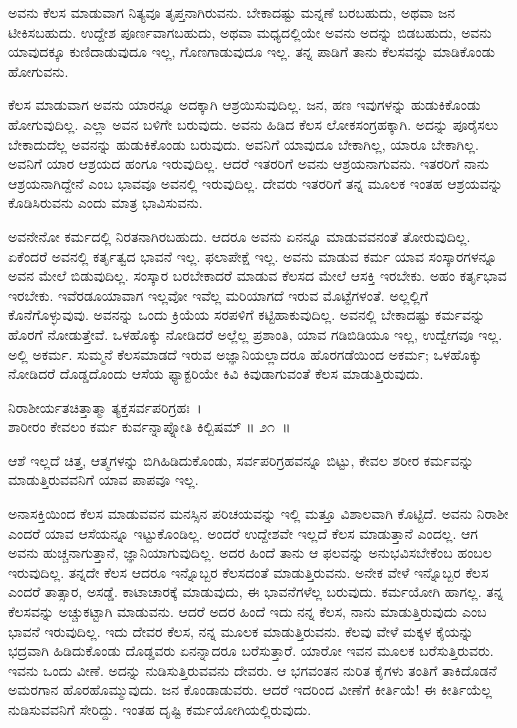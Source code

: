 ಅವನು ಕೆಲಸ ಮಾಡುವಾಗ ನಿತ್ಯವೂ ತೃಪ್ತನಾಗಿರುವನು. ಬೇಕಾದಷ್ಟು ಮನ್ನಣೆ ಬರಬಹುದು, ಅಥವಾ ಜನ ಟೀಕಿಸಬಹುದು. ಉದ್ದೇಶ ಪೂರ್ಣವಾಗಬಹುದು, ಅಥವಾ ಮಧ್ಯ\-ದಲ್ಲಿಯೇ ಅವನು ಅದನ್ನು ಬಿಡಬಹುದು, ಅವನು ಯಾವುದಕ್ಕೂ ಕುಣಿದಾಡುವುದೂ ಇಲ್ಲ, ಗೊಣಗಾಡುವುದೂ ಇಲ್ಲ. ತನ್ನ ಪಾಡಿಗೆ ತಾನು ಕೆಲಸವನ್ನು ಮಾಡಿಕೊಂಡು ಹೋಗುವನು.

ಕೆಲಸ ಮಾಡುವಾಗ ಅವನು ಯಾರನ್ನೂ ಅದಕ್ಕಾಗಿ ಆಶ್ರಯಿಸುವುದಿಲ್ಲ. ಜನ, ಹಣ ಇವುಗಳನ್ನು ಹುಡುಕಿಕೊಂಡು ಹೋಗುವುದಿಲ್ಲ. ಎಲ್ಲಾ ಅವನ ಬಳಿಗೇ ಬರುವುದು. ಅವನು ಹಿಡಿದ ಕೆಲಸ ಲೋಕಸಂಗ್ರಹಕ್ಕಾಗಿ. ಅದನ್ನು ಪೂರೈಸಲು ಬೇಕಾದುದೆಲ್ಲ ಅವನನ್ನು ಹುಡುಕಿಕೊಂಡು ಬರುವುದು. ಅವನಿಗೆ ಯಾವುದೂ ಬೇಕಾಗಿಲ್ಲ, ಯಾರೂ ಬೇಕಾಗಿಲ್ಲ. ಅವನಿಗೆ ಯಾರ ಆಶ್ರಯದ ಹಂಗೂ ಇರುವುದಿಲ್ಲ. ಆದರೆ ಇತರರಿಗೆ ಅವನು ಆಶ್ರಯನಾಗುವನು. ಇತರರಿಗೆ ನಾನು ಆಶ್ರಯನಾಗಿದ್ದೇನೆ ಎಂಬ ಭಾವವೂ ಅವನಲ್ಲಿ ಇರುವುದಿಲ್ಲ. ದೇವರು ಇತರರಿಗೆ ತನ್ನ ಮೂಲಕ ಇಂತಹ ಆಶ್ರಯವನ್ನು ಕೊಡಿಸಿರುವನು ಎಂದು ಮಾತ್ರ ಭಾವಿಸುವನು.

ಅವನೇನೋ ಕರ್ಮದಲ್ಲಿ ನಿರತನಾಗಿರಬಹುದು. ಆದರೂ ಅವನು ಏನನ್ನೂ ಮಾಡುವವ\-ನಂತೆ ತೋರುವುದಿಲ್ಲ. ಏಕೆಂದರೆ ಅವನಲ್ಲಿ ಕರ್ತೃತ್ವದ ಭಾವನೆ ಇಲ್ಲ. ಫಲಾಪೇಕ್ಷೆ ಇಲ್ಲ. ಅವನು ಮಾಡುವ ಕರ್ಮ ಯಾವ ಸಂಸ್ಕಾರಗಳನ್ನೂ ಅವನ ಮೇಲೆ ಬಿಡುವುದಿಲ್ಲ. ಸಂಸ್ಕಾರ ಬರಬೇಕಾದರೆ ಮಾಡುವ ಕೆಲಸದ ಮೇಲೆ ಆಸಕ್ತಿ ಇರಬೇಕು. ಅಹಂ ಕರ್ತೃಭಾವ ಇರಬೇಕು. ಇವೆರಡೂ\break ಯಾವಾಗ ಇಲ್ಲವೋ ಇವೆಲ್ಲ ಮರಿಯಾಗದೆ ಇರುವ ಮೊಟ್ಟೆಗಳಂತೆ. ಅಲ್ಲಲ್ಲಿಗೆ ಕೊನೆಗೊಳ್ಳುವುವು. ಅವನನ್ನು ಒಂದು ಕ್ರಿಯೆಯ ಸರಪಳಿಗೆ ಕಟ್ಟಿಹಾಕುವುದಿಲ್ಲ. ಅವನಲ್ಲಿ ಬೇಕಾದಷ್ಟು ಕರ್ಮವನ್ನು ಹೊರಗೆ ನೋಡುತ್ತೇವೆ. ಒಳಹೊಕ್ಕು ನೋಡಿದರೆ ಅಲ್ಲೆಲ್ಲ ಪ್ರಶಾಂತಿ, ಯಾವ ಗಡಿಬಿಡಿಯೂ ಇಲ್ಲ, ಉದ್ವೇಗವೂ ಇಲ್ಲ. ಅಲ್ಲಿ ಅಕರ್ಮ. ಸುಮ್ಮನೆ ಕೆಲಸಮಾಡದೆ ಇರುವ ಅಜ್ಞಾನಿಯಲ್ಲಾದರೂ ಹೊರಗಡೆಯಿಂದ ಅಕರ್ಮ; ಒಳಹೊಕ್ಕು ನೋಡಿದರೆ ದೊಡ್ಡದೊಂದು ಆಸೆಯ ಫ್ಯಾಕ್ಟರಿಯೇ ಕಿವಿ ಕಿವುಡಾಗುವಂತೆ ಕೆಲಸ ಮಾಡುತ್ತಿರುವುದು.

\begin{shloka}
ನಿರಾಶೀರ್ಯತಚಿತ್ತಾತ್ಮಾ ತ್ಯಕ್ತಸರ್ವಪರಿಗ್ರಹಃ~।\\ಶಾರೀರಂ ಕೇವಲಂ ಕರ್ಮ ಕುರ್ವನ್ನಾಪ್ನೋತಿ ಕಿಲ್ಬಿಷಮ್ \hfill॥ ೨೧~॥
\end{shloka}

\begin{artha}
ಆಶೆ ಇಲ್ಲದೆ ಚಿತ್ತ, ಆತ್ಮಗಳನ್ನು ಬಿಗಿಹಿಡಿದುಕೊಂಡು, ಸರ್ವಪರಿಗ್ರಹವನ್ನೂ ಬಿಟ್ಟು, ಕೇವಲ ಶರೀರ ಕರ್ಮವನ್ನು ಮಾಡುತ್ತಿರುವವನಿಗೆ ಯಾವ ಪಾಪವೂ ಇಲ್ಲ.
\end{artha}

ಅನಾಸಕ್ತಿಯಿಂದ ಕೆಲಸ ಮಾಡುವವನ ಮನಸ್ಸಿನ ಪರಿಚಯವನ್ನು ಇಲ್ಲಿ ಮತ್ತೂ ವಿಶಾಲವಾಗಿ ಕೊಟ್ಟಿದೆ. ಅವನು ನಿರಾಶೀ ಎಂದರೆ ಯಾವ ಆಸೆಯನ್ನೂ ಇಟ್ಟುಕೊಂಡಿಲ್ಲ. ಅಂದರೆ ಉದ್ದೇಶವೇ ಇಲ್ಲದೆ ಕೆಲಸ ಮಾಡುತ್ತಾನೆ ಎಂದಲ್ಲ. ಆಗ ಅವನು ಹುಚ್ಚನಾಗುತ್ತಾನೆ, ಜ್ಞಾನಿಯಾಗುವುದಿಲ್ಲ. ಅದರ ಹಿಂದೆ ತಾನು ಆ ಫಲವನ್ನು ಅನುಭವಿಸಬೇಕೆಂಬ ಹಂಬಲ ಇರುವುದಿಲ್ಲ. ತನ್ನದೇ ಕೆಲಸ ಆದರೂ ಇನ್ನೊಬ್ಬರ ಕೆಲಸದಂತೆ ಮಾಡುತ್ತಿರುವನು. ಅನೇಕ ವೇಳೆ ಇನ್ನೊಬ್ಬರ ಕೆಲಸ ಎಂದರೆ ತಾತ್ಸಾರ, ಅಸಡ್ಡೆ. ಕಾಟಾಚಾರಕ್ಕೆ ಮಾಡುವುದು, ಈ ಭಾವನೆಗಳೆಲ್ಲ ಬರುವುದು. ಕರ್ಮಯೋಗಿ ಹಾಗಲ್ಲ. ತನ್ನ ಕೆಲಸವನ್ನು ಅಚ್ಚುಕಟ್ಟಾಗಿ ಮಾಡುವನು. ಆದರೆ ಅದರ ಹಿಂದೆ ಇದು ನನ್ನ ಕೆಲಸ, ನಾನು ಮಾಡುತ್ತಿರುವುದು ಎಂಬ ಭಾವನೆ ಇರುವುದಿಲ್ಲ. ಇದು ದೇವರ ಕೆಲಸ, ನನ್ನ ಮೂಲಕ ಮಾಡುತ್ತಿರುವನು. ಕೆಲವು ವೇಳೆ ಮಕ್ಕಳ ಕೈಯನ್ನು ಭದ್ರವಾಗಿ ಹಿಡಿದುಕೊಂಡು ದೊಡ್ಡವರು ಏನನ್ನಾದರೂ ಬರೆಸುತ್ತಾರೆ. ಯಾರೋ ಇವನ ಮೂಲಕ ಬರೆಸುತ್ತಿರುವರು. ಇವನು ಒಂದು ವೀಣೆ. ಅದನ್ನು ನುಡಿಸುತ್ತಿರುವವನು ದೇವರು. ಆ ಭಗವಂತನ ನುರಿತ ಕೈಗಳು ತಂತಿಗೆ ತಾಕಿದೊಡನೆ ಅಮರಗಾನ ಹೊರಹೊಮ್ಮುವುದು. ಜನ ಕೊಂಡಾಡುವರು. ಆದರೆ ಇದರಿಂದ ವೀಣೆಗೆ ಕೀರ್ತಿಯೆ! ಈ ಕೀರ್ತಿಯೆಲ್ಲ ನುಡಿಸುವವನಿಗೆ ಸೇರಿದ್ದು. ಇಂತಹ ದೃಷ್ಟಿ ಕರ್ಮಯೋಗಿಯಲ್ಲಿರುವುದು.


